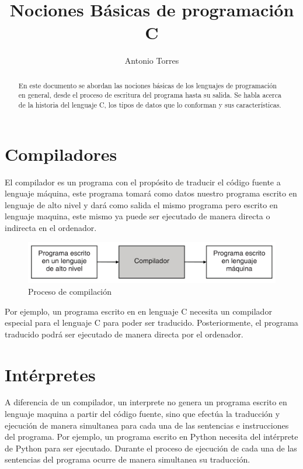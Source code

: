 \documentclass[]{article}
\title{Nociones Básicas de programación C}
\author{Antonio Torres}
\begin{document}
\maketitle

\begin{abstract}
En este documento se abordan las nociones básicas de los lenguajes de programación en general, desde el proceso de escritura del programa hasta su salida. Se habla acerca de la historia del lenguaje C, los tipos de datos que lo conforman y sus características.
\end{abstract}

\tableofcontents

\pagebreak
\section{Compiladores}
El compilador es un programa con el propósito de traducir el código fuente a lenguaje máquina, este programa tomará como datos nuestro programa escrito en lenguaje de alto nivel y dará como salida el mismo programa pero escrito en lenguaje maquina, este mismo ya puede ser ejecutado de manera directa o indirecta en el ordenador.
\begin{figure}[h!]
	\centering
	\includegraphics[width=0.7\linewidth]{"img/proceso de compilacion.jpeg"}
	\caption{Proceso de compilación}
	\label{fig:proceso-de-compilacion}
\end{figure}

Por ejemplo, un programa escrito en en lenguaje C necesita un compilador especial para el lenguaje C para poder ser traducido. Posteriormente, el programa traducido podrá ser ejecutado de manera directa por el ordenador. 

\section{Intérpretes}
A diferencia de un compilador, un interprete no genera un programa escrito en lenguaje maquina a partir del código fuente, sino que efectúa la traducción y ejecución de manera simultanea para cada una de las sentencias e instrucciones del programa. Por ejemplo, un programa escrito en Python necesita del intérprete de Python para ser ejecutado. Durante el proceso de ejecución de cada una de las sentencias del programa ocurre de manera simultanea su traducción.
\end{document}
